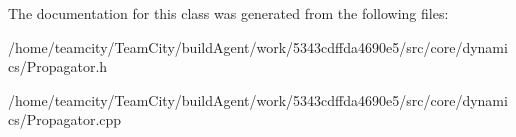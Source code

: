 The documentation for this class was generated from the following files\+:\begin{DoxyCompactItemize}
\item 
/home/teamcity/\+Team\+City/build\+Agent/work/5343cdffda4690e5/src/core/dynamics/Propagator.\+h\item 
/home/teamcity/\+Team\+City/build\+Agent/work/5343cdffda4690e5/src/core/dynamics/Propagator.\+cpp\end{DoxyCompactItemize}
